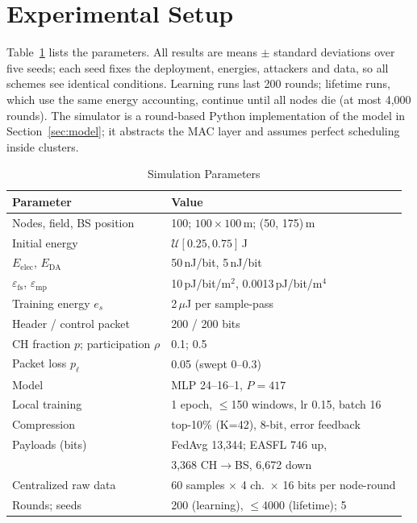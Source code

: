 \documentclass[journal,onecolumn,draftclsnofoot,12pt]{IEEEtran}
\begin{document}
\section{Experimental Setup}\label{sec:setup}
Table~\ref{tab:params} lists the parameters. All results are means $\pm$ standard deviations over five seeds; each seed fixes the deployment, energies, attackers and data, so all schemes see identical conditions. Learning runs last 200 rounds; lifetime runs, which use the same energy accounting, continue until all nodes die (at most 4,000 rounds). The simulator is a round-based Python implementation of the model in Section~\ref{sec:model}; it abstracts the MAC layer and assumes perfect scheduling inside clusters.

\begin{table}[t]
\caption{Simulation Parameters}\label{tab:params}
\centering\scriptsize
\begin{tabular}{@{}ll@{}}
\toprule
Parameter & Value\\
\midrule
Nodes, field, BS position & 100; $100\times100$\,m; (50, 175)\,m\\
Initial energy & $\mathcal{U}[0.25,0.75]$\,J\\
$E_{\mathrm{elec}}$, $E_{\mathrm{DA}}$ & 50\,nJ/bit, 5\,nJ/bit\\
$\varepsilon_{\mathrm{fs}}$, $\varepsilon_{\mathrm{mp}}$ & 10\,pJ/bit/m$^2$, 0.0013\,pJ/bit/m$^4$\\
Training energy $e_s$ & 2\,$\mu$J per sample-pass\\
Header / control packet & 200 / 200 bits\\
CH fraction $p$; participation $\rho$ & 0.1; 0.5\\
Packet loss $p_\ell$ & 0.05 (swept 0--0.3)\\
Model & MLP 24--16--1, $P=417$\\
Local training & 1 epoch, $\le$150 windows, lr 0.15, batch 16\\
Compression & top-10\% (K=42), 8-bit, error feedback\\
Payloads (bits) & FedAvg 13,344; EASFL 746 up,\\
 & 3,368 CH$\to$BS, 6,672 down\\
Centralized raw data & 60 samples $\times$ 4 ch.\ $\times$ 16 bits per node-round\\
Rounds; seeds & 200 (learning), $\le$4000 (lifetime); 5\\
\bottomrule
\end{tabular}
\end{table}
\end{document}
